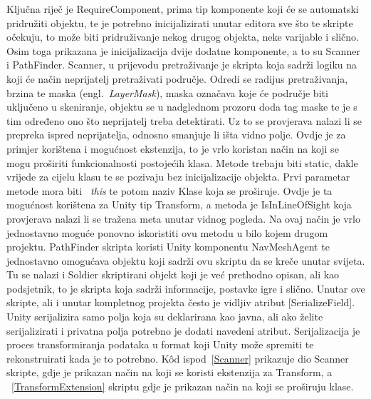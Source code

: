 Ključna riječ je RequireComponent, prima tip komponente koji će se automatski pridružiti objektu, te je potrebno inicijalizirati unutar editora sve što te skripte očekuju, to može biti pridruživanje nekog drugog objekta, neke varijable i slično. Osim toga prikazana je inicijalizacija dvije dodatne komponente, a to su Scanner i PathFinder. Scanner, u prijevodu pretraživanje je skripta koja sadrži logiku na koji će način neprijatelj pretraživati područje. Odredi se radijus pretraživanja, brzina te maska (engl.~\textit{LayerMask}), maska označava koje će područje biti uključeno u skeniranje, objektu se u nadglednom prozoru doda tag maske te je s tim određeno ono što neprijatelj treba detektirati. Uz to se provjerava nalazi li se prepreka ispred neprijatelja, odnosno smanjuje li išta vidno polje. Ovdje je za primjer korištena i mogućnost ekstenzija, to je vrlo koristan način na koji se mogu proširiti funkcionalnosti postojećih klasa. Metode trebaju biti static, dakle vrijede za cijelu klasu te se pozivaju bez inicijalizacije objekta. Prvi parametar metode mora biti ~\textit{this} te potom naziv Klase koja se proširuje. Ovdje je ta mogućnost korištena za Unity tip Transform, a metoda je IsInLineOfSight koja provjerava nalazi li se tražena meta unutar vidnog pogleda. Na ovaj način je vrlo jednostavno moguće ponovno iskoristiti ovu metodu u bilo kojem drugom projektu. PathFinder skripta koristi Unity komponentu NavMeshAgent te jednostavno omogućava objektu koji sadrži ovu skriptu da se kreče unutar svijeta. 
Tu se nalazi i Soldier skriptirani objekt koji je već prethodno opisan, ali kao podsjetnik, to je skripta koja sadrži informacije, postavke igre i slično. 
Unutar ove skripte, ali i unutar kompletnog projekta često je vidljiv atribut [SerializeField]. Unity serijalizira samo polja koja su deklarirana kao javna, ali ako želite serijalizirati i privatna polja potrebno je dodati navedeni atribut. Serijalizacija je proces transformiranja podataka u format koji Unity može spremiti te rekonstruirati kada je to potrebno.
K\^od ispod~\ref{Scanner} prikazuje dio Scanner skripte, gdje je prikazan način na koji se koristi ekstenzija za Transform, a ~\ref{TransformExtension} skriptu gdje je prikazan način na koji se proširuju klase.

